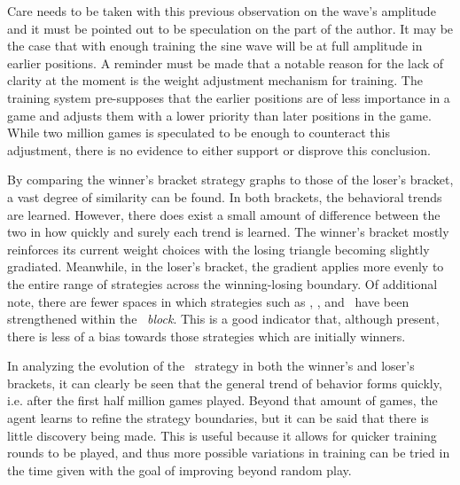 Care needs to be taken with this previous observation on the wave's amplitude
and it must be pointed out to be speculation on the part of the author.
%
It may be the case that with enough training the sine wave will be at full
amplitude in earlier positions.
%
A reminder must be made that
a notable reason for the lack of clarity at the moment is the weight adjustment
mechanism for training.
%
The training system pre-supposes that the earlier positions are of less
importance in a game and adjusts them with a lower priority than later positions
in the game.
%
While two million games is speculated to be enough to counteract this
adjustment,
there is no evidence to either support or disprove this conclusion.





By comparing the winner's bracket strategy graphs to those of the loser's
bracket,
a vast degree of similarity can be found.
%
In both brackets,
the behavioral trends are learned.
%
However,
there does exist a small amount of difference between the two
in how quickly and surely each trend is learned.
%
The winner's bracket mostly reinforces its current weight choices
with the losing triangle becoming slightly gradiated.
Meanwhile,
in the loser's bracket,
the gradient applies more evenly to the entire range of strategies
across the winning-losing boundary.
%
Of additional note,
there are fewer spaces in which
strategies such as \cribminavg, \peggingmaxavggained, and \peggingminavggiven\ 
have been strengthened within the \handmaxmin\ \textit{block}.
%
This is a good indicator that,
although present,
there is less of a bias towards those strategies which are initially winners.




In analyzing the evolution of the \handmaxavg\ strategy in both the winner's
and loser's brackets,
it can clearly be seen that the general trend of behavior forms
quickly,
i.e. after the first half million games played.
%
Beyond that amount of games,
the agent learns to refine the strategy boundaries,
but it can be said that there is little discovery being made.
%
This is useful because it allows for quicker training rounds to be played,
and thus more possible variations in training can be tried in the time given
with the goal of improving beyond random play.












